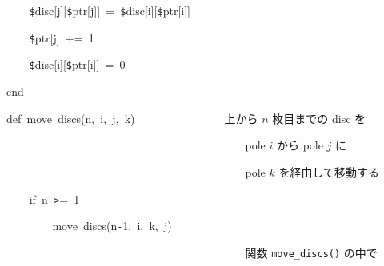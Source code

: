 \documentclass[a4paper,10pt]{article}
\def\mc{\relax}
\begin{document}
\noindent
\mbox{}{\tt\mc \ }{\tt\mc \ }{\tt\mc \ }{\tt\mc \ }{\tt\$}disc[j][{\tt\$}ptr[j]]{\tt\mc \ }={\tt\mc \ }{\tt\$}disc[i][{\tt\$}ptr[i]]

\noindent
\mbox{}{\tt\mc \ }{\tt\mc \ }{\tt\mc \ }{\tt\mc \ }{\tt\$}ptr[j]{\tt\mc \ }+={\tt\mc \ }1

\noindent
\mbox{}{\tt\mc \ }{\tt\mc \ }{\tt\mc \ }{\tt\mc \ }{\tt\$}disc[i][{\tt\$}ptr[i]]{\tt\mc \ }={\tt\mc \ }0

\noindent
\mbox{}end

\noindent
\mbox{}\hfill

\noindent
\mbox{}def{\tt\mc \ }move{\tt\_}discs(n,{\tt\mc \ }i,{\tt\mc \ }j,{\tt\mc \ }k){\tt\mc \ }{\tt\mc \ }{\tt\mc \ }{\tt\mc \ }{\tt\mc \ }{\tt\mc \ }{\tt\mc \ }{\tt\mc \ }{\tt\mc \ }{\tt\mc \ }{\tt\mc \ }{\tt\mc \ }{\tt\mc \ }{\tt\mc \ }\rm\mc {\tt\#} \ 上から $n$ 枚目までの disc を \hfill 
\tt\mc 

\noindent
\mbox{}{\tt\mc \ }{\tt\mc \ }{\tt\mc \ }{\tt\mc \ }{\tt\mc \ }{\tt\mc \ }{\tt\mc \ }{\tt\mc \ }{\tt\mc \ }{\tt\mc \ }{\tt\mc \ }{\tt\mc \ }{\tt\mc \ }{\tt\mc \ }{\tt\mc \ }{\tt\mc \ }{\tt\mc \ }{\tt\mc \ }{\tt\mc \ }{\tt\mc \ }{\tt\mc \ }{\tt\mc \ }{\tt\mc \ }{\tt\mc \ }{\tt\mc \ }{\tt\mc \ }{\tt\mc \ }{\tt\mc \ }{\tt\mc \ }{\tt\mc \ }{\tt\mc \ }{\tt\mc \ }{\tt\mc \ }{\tt\mc \ }{\tt\mc \ }{\tt\mc \ }{\tt\mc \ }{\tt\mc \ }{\tt\mc \ }{\tt\mc \ }\rm\mc {\tt\#} \ pole $i$ から pole $j$ に \hfill 
\tt\mc 

\noindent
\mbox{}{\tt\mc \ }{\tt\mc \ }{\tt\mc \ }{\tt\mc \ }{\tt\mc \ }{\tt\mc \ }{\tt\mc \ }{\tt\mc \ }{\tt\mc \ }{\tt\mc \ }{\tt\mc \ }{\tt\mc \ }{\tt\mc \ }{\tt\mc \ }{\tt\mc \ }{\tt\mc \ }{\tt\mc \ }{\tt\mc \ }{\tt\mc \ }{\tt\mc \ }{\tt\mc \ }{\tt\mc \ }{\tt\mc \ }{\tt\mc \ }{\tt\mc \ }{\tt\mc \ }{\tt\mc \ }{\tt\mc \ }{\tt\mc \ }{\tt\mc \ }{\tt\mc \ }{\tt\mc \ }{\tt\mc \ }{\tt\mc \ }{\tt\mc \ }{\tt\mc \ }{\tt\mc \ }{\tt\mc \ }{\tt\mc \ }{\tt\mc \ }\rm\mc {\tt\#} \ pole $k$ を経由して移動する \hfill 
\tt\mc 

\noindent
\mbox{}{\tt\mc \ }{\tt\mc \ }{\tt\mc \ }{\tt\mc \ }if{\tt\mc \ }n{\tt\mc \ }{\tt >}={\tt\mc \ }1

\noindent
\mbox{}{\tt\mc \ }{\tt\mc \ }{\tt\mc \ }{\tt\mc \ }{\tt\mc \ }{\tt\mc \ }{\tt\mc \ }{\tt\mc \ }move{\tt\_}discs(n{\tt -}1,{\tt\mc \ }i,{\tt\mc \ }k,{\tt\mc \ }j)

\noindent
\mbox{}{\tt\mc \ }{\tt\mc \ }{\tt\mc \ }{\tt\mc \ }{\tt\mc \ }{\tt\mc \ }{\tt\mc \ }{\tt\mc \ }{\tt\mc \ }{\tt\mc \ }{\tt\mc \ }{\tt\mc \ }{\tt\mc \ }{\tt\mc \ }{\tt\mc \ }{\tt\mc \ }{\tt\mc \ }{\tt\mc \ }{\tt\mc \ }{\tt\mc \ }{\tt\mc \ }{\tt\mc \ }{\tt\mc \ }{\tt\mc \ }{\tt\mc \ }{\tt\mc \ }{\tt\mc \ }{\tt\mc \ }{\tt\mc \ }{\tt\mc \ }{\tt\mc \ }{\tt\mc \ }{\tt\mc \ }{\tt\mc \ }{\tt\mc \ }{\tt\mc \ }{\tt\mc \ }{\tt\mc \ }{\tt\mc \ }{\tt\mc \ }\rm\mc {\tt\#} \ 関数 {\tt move\_discs()} の中で \hfill 
\tt\mc 
\end{document}
